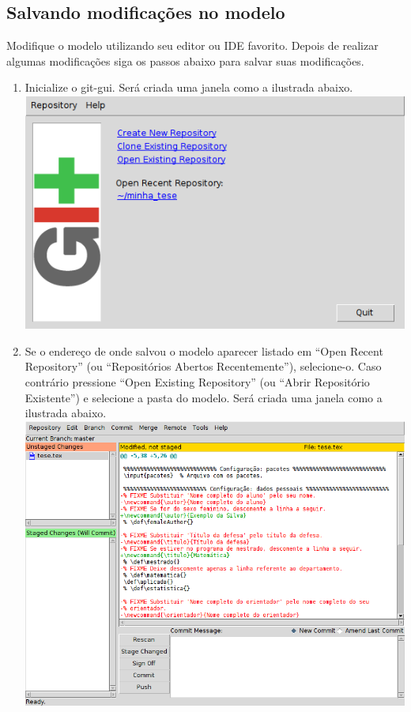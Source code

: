 \subsection{Salvando modificações no modelo}
Modifique o modelo utilizando seu editor ou IDE favorito. Depois de realizar
algumas modificações siga os passos abaixo para salvar suas modificações.
\begin{enumerate}
  \item Inicialize o git-gui. Será criada uma janela como a ilustrada abaixo.\\
    \includegraphics[scale=.6]{figuras/git-gui00-1}
  \item Se o endereço de onde salvou o modelo aparecer listado em ``Open Recent
    Repository'' (ou ``Repositórios Abertos Recentemente''), selecione-o. Caso
    contrário pressione ``Open Existing Repository'' (ou ``Abrir Repositório
    Existente'') e selecione a pasta do modelo. Será criada uma janela como a
    ilustrada abaixo.\\
    \includegraphics[scale=.6]{figuras/git-gui04-0}

\end{enumerate}
